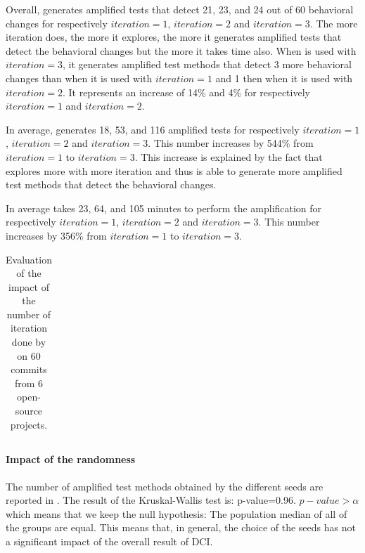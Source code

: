 Overall, \DCII generates amplified tests that detect 21, 23, and 24 out of 60 behavioral changes for respectively $iteration=1$, $iteration=2$ and $iteration=3$.
The more iteration \DCII does, the more it explores, the more it generates amplified tests that detect the behavioral changes but the more it takes time also.
When \DCII is used with $iteration=3$, it generates amplified test methods that detect 3 more behavioral changes than when it is used with $iteration=1$ and 1 then when it is used with $iteration=2$. It represents an increase of 14\% and 4\% for respectively $iteration=1$ and $iteration=2$.

In average, \DCII generates 18, 53, and 116 amplified tests for respectively $iteration=1$, $iteration=2$ and $iteration=3$. 
This number increases by 544\% from $iteration=1$ to $iteration=3$.
This increase is explained by the fact that \DCII explores more with more iteration and thus is able to generate more amplified test methods that detect the behavioral changes.

In average \DCII takes 23, 64, and 105 minutes to perform the amplification for respectively $iteration=1$, $iteration=2$ and $iteration=3$.
This number increases by 356\% from $iteration=1$ to $iteration=3$.

\begin{table}
\small
\def\arraystretch{1}%
\setlength\tabcolsep{6pt} %
\caption{Evaluation of the impact of the number of iteration done by \DCII on 60 commits from 6 open-source projects.}
\label{tab:overall_result_iteration}
\begin{tabular}{l|c|cc|cc|cc}

\end{tabular}
\end{table}

\paragraph{Impact of the randomness}

The number of amplified test methods obtained by the different seeds are reported in .
The result of the Kruskal-Wallis test is:  p-value=0.96.
$p-value>\alpha$ which means that we keep the null hypothesis: 
The population median of all of the groups are equal.
This means that, in general, the choice of the seeds has not a significant impact of the overall result of DCI.

